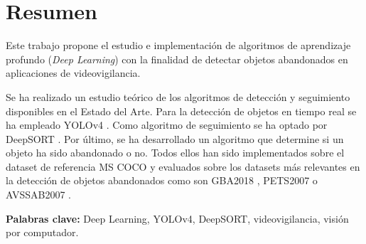 
\chapter*{Resumen}
\label{cha:resumen}


Este trabajo propone el estudio e implementación de algoritmos de aprendizaje profundo (\textit{Deep Learning}) con la finalidad de detectar objetos abandonados en aplicaciones de videovigilancia.

Se ha realizado un estudio teórico de los algoritmos de detección y seguimiento disponibles en el Estado del Arte. Para la detección de objetos en tiempo real se ha empleado YOLOv4 \cite{bochkovskiy2020yolov4}. Como algoritmo de seguimiento se ha optado por DeepSORT \cite{Wojke2017simple}. Por último, se ha desarrollado un algoritmo que determine si un objeto ha sido abandonado o no. Todos ellos han sido implementados sobre el dataset de referencia MS COCO \cite{lin2015microsoft} y evaluados sobre los datasets más relevantes en la detección de objetos abandonados como son GBA2018 \cite{gba-dataset}, PETS2007 \cite{pets2007-dataset} o AVSSAB2007 \cite{AVSSAB2007-dataset}.

\textbf{Palabras clave:} Deep Learning, YOLOv4, DeepSORT, videovigilancia, visión por computador.